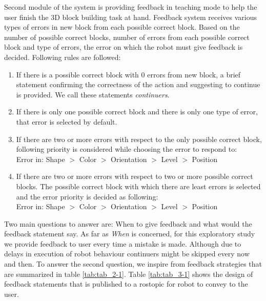 Second module of the system is providing feedback in teaching mode to help the user finish the 3D block building task at hand. Feedback system receives various types of errors in new block from each possible correct block. Based on the number of possible correct blocks, number of errors from each possible correct block and type of errors, the error on which the robot must give feedback is decided. Following rules are followed:
\begin{enumerate}
    \item If there is a possible correct block with 0 errors from new block, a brief statement confirming the correctness of the action and suggesting to continue is provided. We call these statements \emph{continuers}. 
    \item If there is only one possible correct block and there is only one type of error, that error is selected by default.
    \item If there are two or more errors with respect to the only possible correct block, following priority is considered while choosing the error to respond to:\\
    Error in: Shape $>$ Color $>$ Orientation $>$ Level $>$ Position
    \item If there are two or more errors with respect to two or more possible correct blocks. The possible correct block with which there are least errors is selected and the error priority is decided as following:\\
    Error in: Shape $>$ Color $>$ Orientation $>$ Level $>$ Position
\end{enumerate}
Two main questions to answer are: When to give feedback and what would the feedback statement say. As far as \emph{When} is concerned, for this exploratory study we provide feedback to user every time a mistake is made. Although due to delays in execution of robot behaviour continuers might be skipped every now and then. To answer the second question, we inspire from feedback strategies that are summarized in table \ref{tab:tab_2-1}. Table \ref{tab:tab_3-1} shows the design of feedback statements that is published to a rostopic for robot to convey to the user. 
